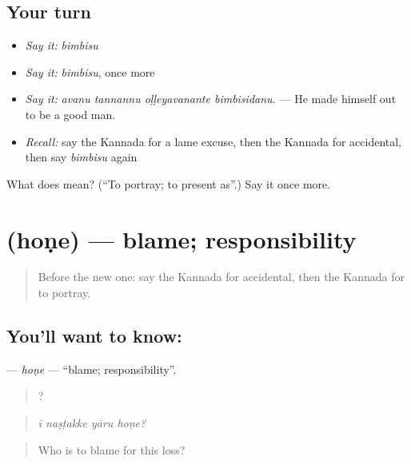 \subsection*{Your turn}
\begin{itemize}
\raggedright
  \item \emph{Say it:} \emph{bimbisu}
  \item \emph{Say it:} \emph{bimbisu}, once more
  \item \emph{Say it:} \emph{avanu tannannu oḷḷeyavanante bimbisidanu.} — He made himself out to be a good man.
  \item \emph{Recall:} say the Kannada for a lame excuse, then the Kannada for accidental, then say \emph{bimbisu} again
\end{itemize}

\begin{tcolorbox}[breakable,colback=teal!4,colframe=teal!35!black,title={Before you move on}]
What does  mean? (\textquotedblleft{}To portray; to present as\textquotedblright{}.) Say it once more.
\end{tcolorbox}
\section[\texorpdfstring{\kn{ಹೊಣೆ} (hoṇe)}{ಹೊಣೆ (hoṇe)}]{ (hoṇe) — blame; responsibility}

\label{lesson:KA-C386-hone}



\begin{quote}
Before the new one: say the Kannada for accidental, then the Kannada for to portray.
\end{quote}

\subsection*{You'll want to know: }
\textbf{} — \emph{hoṇe} — \textquotedblleft{}blame; responsibility\textquotedblright{}.

\begin{quote}
   ?
\end{quote}

\begin{quote}
\emph{ī naṣṭakke yāru hoṇe?}
\end{quote}

\begin{quote}
Who is to blame for this loss?
\end{quote}

